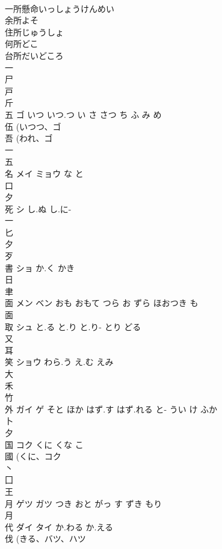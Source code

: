 \documentclass[8pt]{extreport}
\begin{document}
\begin{CJK}{UTF8}{min}
\\	一所懸命いっしょうけんめい
\\	余所よそ
\\	住所じゅうしょ
\\	何所どこ
\\	台所だいどころ
\\	一 
\\	尸 
\\	戸 
\\	斤 
\\	五	ゴ	いつ いつ.つ い さ さつ ち ふ み め	
\\	伍 (いつつ、ゴ 
\\	吾 (われ、ゴ 
\\	一 
\\	五 
\\	名	メイ ミョウ	な と	
\\	口 
\\	夕 
\\	死	シ	し.ぬ し.に-	
\\	一 
\\	匕 
\\	夕 
\\	歹 
\\	書	ショ	か.く かき	
\\	日 
\\	聿 
\\	面	メン ベン	おも おもて つら お ずら ほおつき も	
\\	面 
\\	取	シュ	と.る と.り と.り- とり どる	
\\	又 
\\	耳 
\\	笑	ショウ	わら.う え.む えみ	
\\	大 
\\	禾 
\\	竹 
\\	外	ガイ ゲ	そと ほか はず.す はず.れる と- うい け ふか	
\\	卜 
\\	夕 
\\	国	コク	くに くな こ	
\\	國 (くに、コク 
\\	丶 
\\	囗 
\\	王 
\\	月	ゲツ ガツ	つき おと がっ す ずき もり	
\\	月 
\\	代	ダイ タイ	か.わる か.える	
\\	伐 (きる、バツ、ハツ 

\end{CJK}
\end{document}

